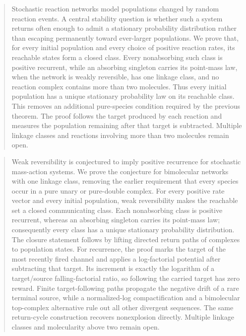 \ifdefined\japsubmission
\begin{abstract}
Stochastic reaction networks model populations changed by random reaction
events.  A central stability question is whether such a system returns often
enough to admit a stationary probability distribution rather than escaping
permanently toward ever-larger populations.  We prove that, for every initial
population and every choice of positive reaction rates, its reachable states
form a closed class.  Every nonabsorbing such class is positive recurrent,
while an absorbing singleton carries its point-mass law, when the network is
weakly reversible, has one linkage class, and no reaction complex contains
more than two molecules.  Thus every initial population has a unique
stationary probability law on its reachable class.  This removes an additional
pure-species condition required by the previous theorem.  The proof follows
the target produced by each reaction and measures the population remaining
after that target is subtracted.  Multiple linkage classes and reactions
involving more than two molecules remain open.
\end{abstract}
\else
\begin{abstract}
Weak reversibility is conjectured to imply positive recurrence for stochastic
mass-action systems.  We prove the conjecture for bimolecular networks with
one linkage class, removing the earlier requirement that every species occur
in a pure unary or pure-double complex.  For every positive rate vector and
every initial population, weak reversibility makes the reachable set a closed
communicating class.  Each nonabsorbing class is positive recurrent, whereas
an absorbing singleton carries its point-mass law; consequently every class
has a unique stationary probability distribution.  The closure statement
follows by lifting directed return paths of complexes to population states.
For recurrence, the proof marks the target of the most recently fired channel
and applies a log-factorial potential after subtracting that target.  Its
increment is exactly the logarithm of a target/source falling-factorial ratio,
so following the carried target has zero reward.  Finite target-following paths
propagate the negative drift of a rare terminal source, while a normalized-log
compactification and a bimolecular top-complex alternative rule out all other
divergent sequences.  The same return-cycle construction recovers nonexplosion
directly.  Multiple linkage classes and molecularity above two remain open.
\end{abstract}
\fi

